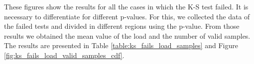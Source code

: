 These figures show the results for all the cases in which the \acs{K-S} test failed. It is necessary to differentiate for different p-values. For this, we collected the data of the failed tests and divided in different regions using the p-value. From those results we obtained the mean value of the load and the number of valid samples. The results are presented in Table \ref{table:ks_fails_load_samples} and Figure \ref{fig:ks_fails_load_valid_samples_cdf}.


